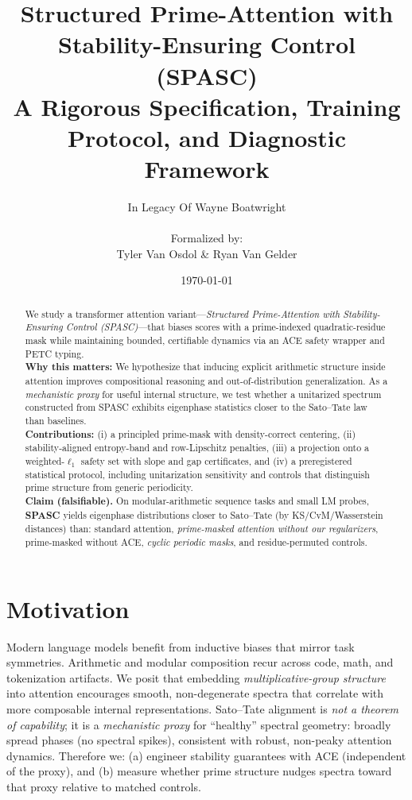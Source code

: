 \documentclass[11pt]{article}
\title{Structured Prime-Attention with Stability-Ensuring Control (SPASC)\\\large A Rigorous Specification, Training Protocol, and Diagnostic Framework}
\author{\normalsize In Legacy Of Wayne Boatwright \\ \\ Formalized by: \\ Tyler Van Osdol \& Ryan Van Gelder}
\date{\today}
\theoremstyle{definition}
\theoremstyle{remark}
\begin{document}
\maketitle
\begin{abstract}
We study a transformer attention variant---\emph{Structured Prime-Attention with Stability-Ensuring Control (SPASC)}---that biases scores with a prime-indexed quadratic-residue mask while maintaining bounded, certifiable dynamics via an ACE safety wrapper and PETC typing.
\\[4pt]
\textbf{Why this matters:} We hypothesize that inducing explicit arithmetic structure inside attention improves compositional reasoning and out-of-distribution generalization. As a \emph{mechanistic proxy} for useful internal structure, we test whether a unitarized spectrum constructed from SPASC exhibits eigenphase statistics closer to the Sato--Tate law than baselines.
\\[4pt]
\textbf{Contributions:} (i) a principled prime-mask with density-correct centering, (ii) stability-aligned entropy-band and row-Lipschitz penalties, (iii) a projection onto a weighted-$\ell_1$ safety set with slope and gap certificates, and (iv) a preregistered statistical protocol, including unitarization sensitivity and controls that distinguish prime structure from generic periodicity.
\\[4pt]
\textbf{Claim (falsifiable).} On modular-arithmetic sequence tasks and small LM probes, \textbf{SPASC} yields eigenphase distributions closer to Sato--Tate (by KS/CvM/Wasserstein distances) than: standard attention, \emph{prime-masked attention without our regularizers}, prime-masked without ACE, \emph{cyclic periodic masks}, and residue-permuted controls.
\end{abstract}

\section{Motivation}
Modern language models benefit from inductive biases that mirror task symmetries. Arithmetic and modular composition recur across code, math, and tokenization artifacts. We posit that embedding \emph{multiplicative-group structure} into attention encourages smooth, non-degenerate spectra that correlate with more composable internal representations.
Sato--Tate alignment is \emph{not a theorem of capability}; it is a \emph{mechanistic proxy} for ``healthy'' spectral geometry: broadly spread phases (no spectral spikes), consistent with robust, non-peaky attention dynamics.
Therefore we: (a) engineer stability guarantees with ACE (independent of the proxy), and (b) measure whether prime structure nudges spectra toward that proxy relative to matched controls.
\end{document}
